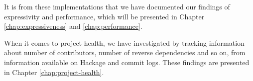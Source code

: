 It is from these implementations that we have documented our findings
of expressivity and performance, which will be presented in Chapter
\ref{chap:expressiveness} and \ref{chap:performance}. 

When it comes to project health, we have investigated by tracking
information about number of contributors, number of reverse
dependencies and so on, from information available on Hackage and
commit logs. These findings are presented in Chapter
\ref{chap:project-health}.







